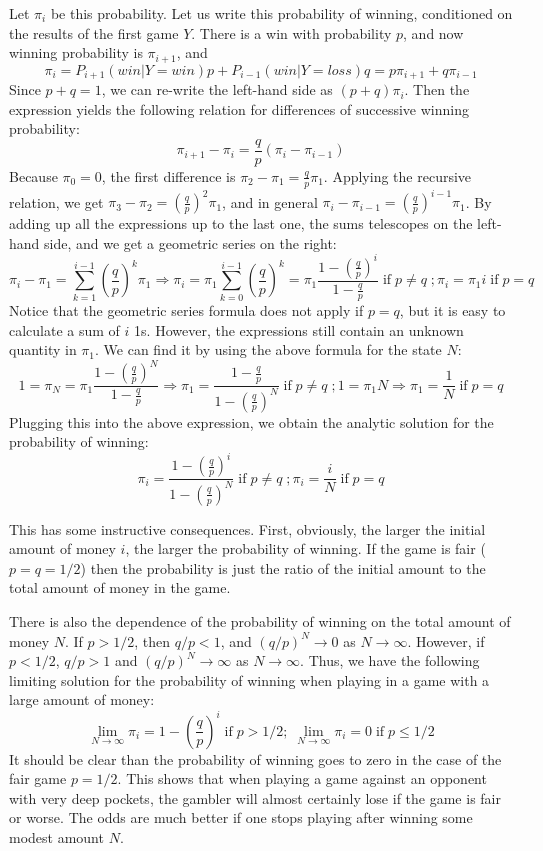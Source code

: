 \documentclass[11pt]{book}
\begin{document}
Let $\pi_i$ be this probability. Let us write this probability of winning, conditioned on the results of the first game $Y$.  There is a win with probability $p$, and now winning probability is $\pi_{i+1}$, and 
$$ \pi_i = P_{i+1}(win | Y = win) p + P_{i-1}(win | Y = loss) q = p \pi_{i+1} + q \pi_{i-1}$$
Since $p+q=1$, we can re-write the left-hand side as $(p+q) \pi_i $. Then the expression yields the following relation for differences of successive winning probability:
$$ \pi_{i+1} -  \pi_i = \frac{q}{p} (\pi_i -  \pi_{i-1} )$$
Because $\pi_0 = 0$, the first difference is $ \pi_{2} -  \pi_1 = \frac{q}{p} \pi_1$. Applying the recursive relation, we get $\pi_3 -  \pi_2 = \left( \frac{q}{p}\right)^2 \pi_1$, and in general
$ \pi_i-  \pi_{i-1} = \left( \frac{q}{p}\right)^{i-1} \pi_1$. By adding up all the expressions up to the last one, the sums telescopes on the left-hand side, and we get a geometric series on the right:
$$  \pi_i -  \pi_1 = \sum_{k=1}^{i-1} \left( \frac{q}{p}\right)^{k} \pi_1 \Rightarrow \pi_i =  \pi_1 \sum_{k=0}^{i-1} \left( \frac{q}{p}\right)^{k} = \pi_1\frac{1 - \left(\frac{q}{p}\right)^i }{1 -  \frac{q}{p}}
\; \mathrm {if} \; p \neq q \; ; \pi_i = \pi_1 i \; \mathrm{if} \; p = q
$$
Notice that the geometric series formula does not apply if $p=q$, but it is easy to calculate a sum of $i$ 1s. However, the expressions still contain an unknown quantity in $\pi_1$. We can find it by using the above formula for the state $N$:
$$ 1 = \pi_N = \pi_1\frac{1 - \left( \frac{q}{p}\right)^N }{1 -  \frac{q}{p}}  \Rightarrow \pi_1 = \frac{1 -\frac{q}{p}}{1 -  \left(\frac{q}{p}\right)^N} \; \mathrm{if} \; p \neq q \; ; 1 = \pi_1 N \Rightarrow  \pi_1 = \frac{1}{N} \; \mathrm{if} \; p = q$$
Plugging this into the above expression, we obtain the analytic solution for the probability of winning:
$$  \pi_i =   \frac{1 - \left( \frac{q}{p}\right)^i }{1 -  \left(\frac{q}{p}\right)^N} \; \mathrm{if} \; p \neq q \; ;  \pi_i = \frac{i}{N} \; \mathrm{if} \; p = q $$

This has some instructive consequences. First, obviously, the larger the initial amount of money $i$, the larger the probability of winning. If the game is fair ($p=q=1/2$) then the probability is just the ratio of the initial amount to the total amount of money in the game.

There is also the dependence of the probability of winning on the total amount of money $N$.  If $p > 1/2$, then $q/p < 1$, and $ (q/p)^N \rightarrow 0$ as $N  \rightarrow \infty$.
However, if $ p < 1/2$, $q/p >1$ and $ (q/p)^N \rightarrow \infty$ as $N  \rightarrow \infty$. Thus, we have the following limiting solution for the probability of winning when playing in  a game with a large  amount of money:
$$ \lim _{N \rightarrow \infty } \pi_i  = 1 - \left(\frac{q}{p}\right)^i \; \mathrm{if} \; p > 1/2 ; \;  \lim _{N \rightarrow \infty } \pi_i  = 0 \; \mathrm{if} \; p \leq 1/2$$ 
It should be clear than the probability of winning goes to zero in the case of the fair game $p=1/2$. This shows that when playing a game against an opponent with very deep pockets, the gambler will almost certainly lose if the game is fair or worse. The odds are much better if one stops playing after winning some modest amount $N$.
\end{document}
